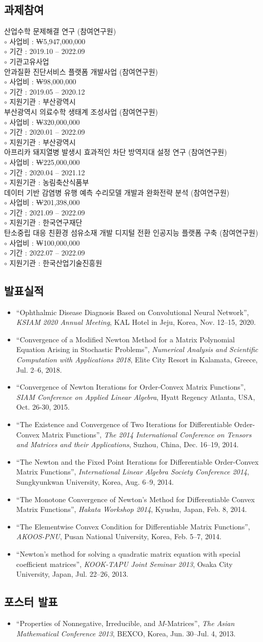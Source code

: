 \documentclass[11pt]{article} %
\newcommand\myprojs{
	산업수학 문제해결 연구 (참여연구원) \\
	$\circ$ 사업비 : ₩5,947,000,000 \\
	$\circ$ 기간 : 2019.10 -- 2022.09 \\
	$\circ$ 기관고유사업 \\
	
	안과질환 진단서비스 플랫폼 개발사업 (참여연구원) \\
	$\circ$ 사업비 : ₩98,000,000 \\
	$\circ$ 기간 : 2019.05 -- 2020.12 \\
	$\circ$ 지원기관 : 부산광역시 \\
	
	부산광역시 의료수학 생태계 조성사업 (참여연구원) \\
	$\circ$ 사업비 : ₩320,000,000 \\
	$\circ$ 기간 : 2020.01 -- 2022.09 \\
	$\circ$ 지원기관 : 부산광역시 \\
	
	아프리카 돼지열병 발생시 효과적인 차단 방역지대 설정 연구 (참여연구원) \\
	$\circ$ 사업비 : ₩225,000,000 \\
	$\circ$ 기간 : 2020.04 -- 2021.12 \\
	$\circ$ 지원기관 : 농림축산식품부 \\
	
	데이터 기반 감염병 유행 예측 수리모델 개발과 완화전략 분석 (참여연구원) \\
	$\circ$ 사업비 : ₩201,398,000 \\
	$\circ$ 기간 : 2021.09 -- 2022.09 \\
	$\circ$ 지원기관 : 한국연구재단 \\
	
	탄소중립 대응 친환경 섬유소재 개발 디지털 전환 인공지능 플랫폼 구축 (참여연구원) \\
	$\circ$ 사업비 : ₩100,000,000 \\
	$\circ$ 기간 : 2022.07 -- 2022.09 \\
	$\circ$ 지원기관 : 한국산업기술진흥원
}
\newcommand\mypresent{
	\begin{itemize}[leftmargin=*]
		\item ``Ophthalmic Disease Diagnosis Based on Convolutional Neural Network'', {\it KSIAM 2020 Annual Meeting}, KAL Hotel in Jeju, Korea, Nov. 12--15, 2020.
		\item ``Convergence of a Modified Newton Method for a Matrix Polynomial Equation Arising in Stochastic Problems'', {\it Numerical Analysis and Scientific Computation with Applications 2018}, Elite City Resort in Kalamata, Greece, Jul. 2--6, 2018.
		\item ``Convergence of Newton Iterations for Order-Convex Matrix Functions'', {\it SIAM Conference on Applied Linear Algebra}, Hyatt Regency Atlanta, USA, Oct. 26-30, 2015.
		\item ``The Existence and Convergence of Two Iterations for Differentiable Order-Convex Matrix Functions'', {\it The 2014 International Conference on Tensors and Matrices and their Applications}, Suzhou, China, Dec. 16--19, 2014.
		\item ``The Newton and the Fixed Point Iterations for Differentiable Order-Convex Matrix Functions'', {\it International Linear Algebra Society Conference 2014}, Sungkyunkwan University, Korea, Aug. 6--9, 2014.
		\item ``The Monotone Convergence of Newton’s Method for Differentiable Convex Matrix Functions'', {\it Hakata Workshop 2014}, Kyushu, Japan, Feb. 8, 2014.
		\item ``The Elementwise Convex Condition for Differentiable Matrix Functions'', {\it AKOOS-PNU}, Pusan National University, Korea, Feb. 5--7, 2014.
		\item ``Newton’s method for solving a quadratic matrix equation with special coefficient matrices'', {\it KOOK-TAPU Joint Seminar 2013}, Osaka City University, Japan, Jul. 22--26, 2013.
		
	\end{itemize}
}
\newcommand\myposter{
	\begin{itemize}[leftmargin=*]
		\item ``Properties of Nonnegative, Irreducible, and $M$-Matrices'', {\it The Asian Mathematical Conference 2013}, BEXCO, Korea, Jun. 30--Jul. 4, 2013.
	\end{itemize}
}
\begin{document}

\subsection*{과제참여}
\myprojs


\subsection*{발표실적}
\renewcommand\labelitemi{\tiny$\bullet$}
\mypresent

\subsection*{포스터 발표}
\myposter

\fi

\newpage\setcounter{page}{1}






%

\profileeng

%

\end{document}
